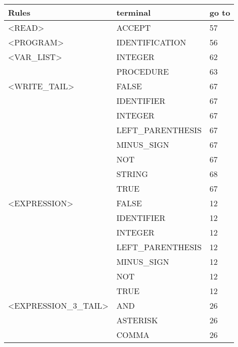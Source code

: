 

\begin{longtable}{|l|l|l|}

\hline

\textbf{Rules}               &   \textbf{terminal}           &   \textbf{go to} \\ \hline
<READ>               &   ACCEPT               &   57 \\ \hline
<PROGRAM>            &   IDENTIFICATION       &   56 \\ \hline
<VAR\_LIST>           &   INTEGER              &   62 \\ \hline
                     &   PROCEDURE            &   63 \\ \hline
<WRITE\_TAIL>         &   FALSE                &   67 \\ \hline
                     &   IDENTIFIER           &   67 \\ \hline
                     &   INTEGER              &   67 \\ \hline
                     &   LEFT\_PARENTHESIS     &   67 \\ \hline
                     &   MINUS\_SIGN           &   67 \\ \hline
                     &   NOT                  &   67 \\ \hline
                     &   STRING               &   68 \\ \hline
                     &   TRUE                 &   67 \\ \hline
<EXPRESSION>         &   FALSE                &   12 \\ \hline
                     &   IDENTIFIER           &   12 \\ \hline
                     &   INTEGER              &   12 \\ \hline
                     &   LEFT\_PARENTHESIS     &   12 \\ \hline
                     &   MINUS\_SIGN           &   12 \\ \hline
                     &   NOT                  &   12 \\ \hline
                     &   TRUE                 &   12 \\ \hline
<EXPRESSION\_3\_TAIL>  &   AND                 &   26 \\ \hline
                     &   ASTERISK             &   26 \\ \hline
                     &   COMMA                &   26 \\ \hline

\end{longtable}
